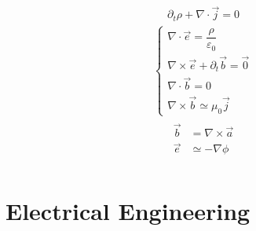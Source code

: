 \documentclass[letterpaper,10pt,english]{jupyterBook}
\begin{document}
\sphinxAtStartPar
{}
\begin{equation*}
\begin{split}\partial_t \rho + \nabla \cdot \vec{j} = 0\end{split}
\end{equation*}
\sphinxAtStartPar
{}
\begin{equation*}
\begin{split}\begin{cases}
    \nabla \cdot \vec{e} = \dfrac{\rho}{\varepsilon_0} \\
    \nabla \times \vec{e} + \partial_t \vec{b} = \vec{0} \\ 
    \nabla \cdot \vec{b} = 0 \\
    \nabla \times \vec{b} \simeq \mu_0 \vec{j} 
  \end{cases}\end{split}
\end{equation*}
\sphinxAtStartPar
{}
\begin{equation*}
\begin{split}\begin{aligned}
      \vec{b} & = \nabla \times \vec{a} \\
      \vec{e} & \simeq - \nabla \phi \\
   \end{aligned}\end{split}
\end{equation*}
\sphinxstepscope


\part{Electrical Engineering}

\sphinxstepscope
\end{document}
